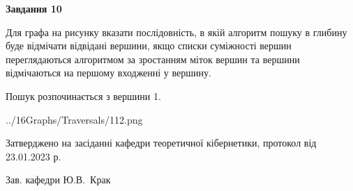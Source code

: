 \documentclass[12pt, ukrainian]{article}
\begin{document}
{\begin {large}
{\begin {center}\textbf{Завдання 10}\end {center}}\par
Для графа на рисунку вказати послідовність, в якій алгоритм пошуку в глибину буде відмічати відвідані вершини, якщо списки суміжності вершин переглядаються алгоритмом за зростанням міток вершин та вершини відмічаються на першому вход\-женні у вершину.\par
Пошук розпочинається з вершини 1.\par

\begin{center}
	{../16Graphs/Traversals/112.png}
\end{center}\par
\newpage


\end {large}
}
{\smallskip \begin {small} Затверджено на засіданні кафедри теоретичної кібернетики, протокол  від   23.01.2023 р.\par\smallskip\smallskip
{\parbox {6.5 cm}{Зав. кафедри \dotfill Ю.В.~Крак}} \end{small}}
\end{document}

